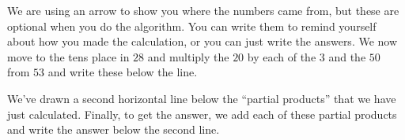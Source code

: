 \documentclass{ximera}
\begin{document}
We are using an arrow to show you where the numbers came from, but these are optional when you do the algorithm. You can write them to remind yourself about how you made the calculation, or you can just write the answers. We now move to the tens place in $28$ and multiply the $20$ by each of the $3$ and the $50$ from $53$ and write these below the line.

\begin{image}
\end{image}

We've drawn a second horizontal line below the ``partial products'' that we have just calculated. Finally, to get the answer, we add each of these partial products and write the answer below the second line. 
\end{document}

